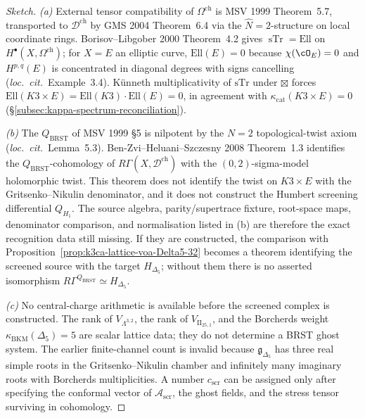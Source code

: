 \begin{proof}[Sketch]
\emph{(a)} External tensor compatibility of $\Omega^{\mathrm{ch}}$ is
MSV 1999 Theorem~5.7, transported to $\mathcal D^{\mathrm{ch}}$ by
GMS 2004 Theorem~6.4 via the $\hat{N}=2$-structure on local coordinate
rings. Borisov--Libgober 2000 Theorem~4.2 gives
$\operatorname{sTr}=\mathrm{Ell}$ on
$H^\bullet(X,\Omega^{\mathrm{ch}})$; for $X=E$ an elliptic curve,
$\mathrm{Ell}(E)=0$ because $\chi(\cO_E)=0$ and $H^{p,q}(E)$ is
concentrated in diagonal degrees with signs cancelling
(\emph{loc.\ cit.}~Example~3.4). K\"unneth multiplicativity of
$\mathrm{sTr}$ under $\boxtimes$ forces
$\mathrm{Ell}(K3\times E)=\mathrm{Ell}(K3)\cdot\mathrm{Ell}(E)=0$,
in agreement with $\kappa_{\mathrm{cat}}(K3\times E)=0$
(\S\ref{subsec:kappa-spectrum-reconciliation}).

\emph{(b)} The $Q_{\mathrm{BRST}}$ of MSV 1999 \S5 is nilpotent by the
$N=2$ topological-twist axiom (\emph{loc.\ cit.}~Lemma~5.3).
Ben-Zvi--Heluani--Szczesny 2008 Theorem~1.3 identifies the
$Q_{\mathrm{BRST}}$-cohomology of
$R\Gamma(X,\mathcal D^{\mathrm{ch}})$ with the $(0,2)$-sigma-model
holomorphic twist. This theorem does not identify the twist on
$K3\times E$ with the Gritsenko--Nikulin denominator, and it does not
construct the Humbert screening differential \(Q_{H_1}\). The source
algebra, parity/supertrace fixture, root-space maps, denominator
comparison, and normalisation listed in (b) are therefore the exact
recognition data still missing. If they are constructed, the comparison
with Proposition~\ref{prop:k3ca-lattice-voa-Delta5-32} becomes a
theorem identifying the screened source with the target
\(H_{\Delta_5}\); without them there is no asserted isomorphism
\(R\Gamma^{Q_{\mathrm{BRST}}}\simeq H_{\Delta_5}\).

\emph{(c)} No central-charge arithmetic is available before the
screened complex is constructed. The rank of \(V_{\Lambda^{3,2}}\), the
rank of \(V_{\mathrm{II}_{25,1}}\), and the Borcherds weight
\(\kappa_{\mathrm{BKM}}(\Delta_5)=5\) are scalar lattice data; they do
not determine a BRST ghost system. The earlier finite-channel count is
invalid because \(\mathfrak g_{\Delta_5}\) has three real simple roots
in the Gritsenko--Nikulin chamber and infinitely many imaginary roots
with Borcherds multiplicities. A number \(c_{\mathrm{scr}}\) can be
assigned only after specifying the conformal vector of
\(\mathcal A_{\mathrm{scr}}\), the ghost fields, and the stress tensor
surviving in cohomology.
\end{proof}

